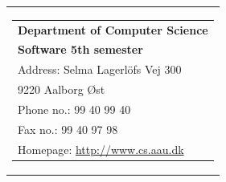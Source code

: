 \Blankpage
{}
\thispagestyle{empty}
\label{chap:titelpage}


    \begin{tabular}{r}
        \parbox{\textwidth}{ %
         \hfill \parbox{4.9cm}{ %
            \begin{tabular}{l} 
                {\textsf{\small{\textbf{Department of Computer Science}}}}\\
                {\textsf{\small{\textbf{Software 5th semester}}}}\\
                {\textsf{\small{Address: Selma Lagerlöfs Vej 300}}} \\
                {\textsf{\small{\hspace{13 mm} 9220 Aalborg Øst }}} \\
                {\textsf{\small{Phone no.: 99 40 99 40}}} \\
                {\textsf{\small{Fax no.: 99 40 97 98}}} \\
                {\textsf{\small{Homepage: \url{http://www.cs.aau.dk}}}}
            \end{tabular}}}
    \end{tabular}
    
